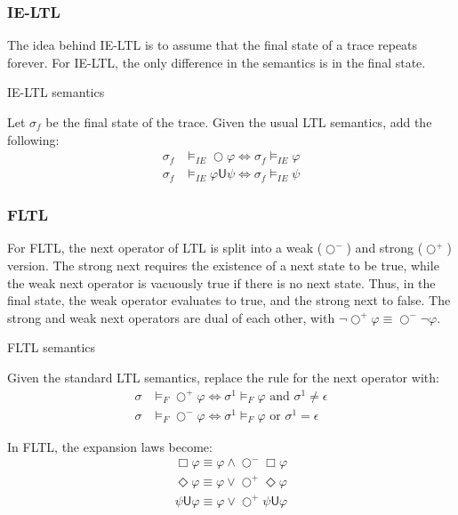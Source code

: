 \documentclass[a4paper]{article}
\newcommand{\U}{\mathsf{U}}
\newcommand{\tand}{\text{ and }}
\newcommand{\tor}{\text{ or }}
\newcommand{\sn}{\bigcirc^+}
\newcommand{\wn}{\bigcirc^-}
\begin{document}
\subsubsection{IE-LTL} The idea behind IE-LTL is to assume that the final state of a trace repeats forever. For IE-LTL, the only difference in the semantics is in the final state.
\begin{defn}{IE-LTL semantics}

  Let $\sigma_f$ be the final state of the trace. Given the usual LTL semantics, add the following:
  \begin{align*}
    \sigma_f &\vDash_{IE} \bigcirc \varphi \iff \sigma_f \vDash_{IE} \varphi\\
    \sigma_f &\vDash_{IE} \varphi \U \psi \iff \sigma_f \vDash_{IE} \psi
  \end{align*}
\end{defn}


\subsubsection{FLTL} For FLTL, the next operator of LTL is split into a weak ($\wn$) and strong ($\sn$) version.
The strong next requires the existence of a next state to be true, while the weak next operator is vacuously true if there is no next state.
Thus, in the final state, the weak operator evaluates to true, and the strong next to false. The strong and weak next operators are dual of each other, with  $\neg\sn\varphi \equiv \wn\neg\varphi$.
\begin{defn}{FLTL semantics}

  Given the standard LTL semantics, replace the rule for the next operator with:
  \begin{align*}
    \sigma&\vDash_F\sn\varphi \iff \sigma^1\vDash_F\varphi \tand \sigma^1 \neq \epsilon\\
    \sigma&\vDash_F\wn\varphi \iff \sigma^1\vDash_F\varphi \tor \sigma^1 = \epsilon
  \end{align*}
\end{defn}

\begin{lem}

  In FLTL, the expansion laws become:
  \begin{align}
    \Box \varphi \equiv \varphi \land \wn \Box \varphi \label{fltl-el1}\\
    \Diamond \varphi \equiv \varphi \lor \sn \Diamond \varphi\\
    \psi \U \varphi \equiv \varphi \lor \sn \psi \U \varphi
  \end{align}

\end{lem}
\end{document}
